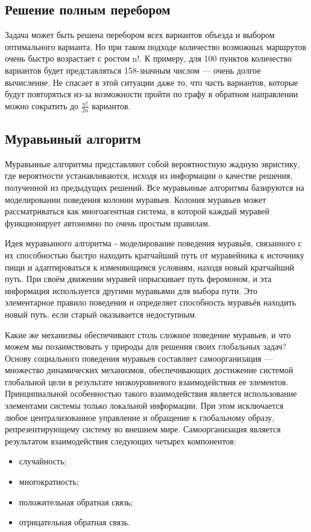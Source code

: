 \documentclass[a4paper, 12pt]{article}
\begin{document}
	\subsection{Решение полным перебором}
	\hspace*{5mm} Задача может быть решена перебором всех вариантов объезда и выбором оптимального варианта. Но при таком подходе количество возможных маршрутов очень быстро возрастает с ростом n!. К примеру, для 100 пунктов количество вариантов будет представляться 158-значным числом — очень долгое вычисление. Не спасает в этой ситуации даже то, что часть вариантов, которые будут повторяться из-за возможности пройти по графу в обратном направлении можно сократить до $\frac{n!}{2n}$ вариантов.
	\subsection{Муравьиный алгоритм}
	\hspace*{5mm} Муравьиные алгоритмы представляют собой вероятностную жадную эвристику, где вероятности устанавливаются, исходя из информации о качестве решения, полученной из предыдущих решений. Все муравьиные алгоритмы базируются на моделировании поведения колонии муравьев. Колония муравьев может рассматриваться как многоагентная система, в которой каждый муравей функционирует автономно по очень простым правилам.
	
	
	 \hspace*{5mm}Идея муравьиного алгоритма - моделирование поведения муравьёв, связанного с их способностью быстро находить кратчайший путь от муравейника к источнику пищи и адаптироваться к изменяющимся условиям, находя новый кратчайший путь. При своём движении муравей опрыскивает путь феромоном, и эта информация используется другими муравьями для выбора пути. Это элементарное правило поведения и определяет способность муравьёв находить новый путь, если старый оказывается недоступным.
	
	\hspace*{5mm}Какие же механизмы обеспечивают столь сложное поведение муравьев, и что можем мы позаимствовать у природы для решения своих глобальных задач? Основу социального поведения муравьев составляет самоорганизация — множество динамических механизмов, обеспечивающих достижение системой глобальной цели в результате низкоуровневого взаимодействия ее элементов. Принципиальной особенностью такого взаимодействия является использование элементами системы только локальной информации. При этом исключается любое централизованное управление и обращение к глобальному образу, репрезентирующему систему во внешнем мире. Самоорганизация является результатом взаимодействия следующих четырех компонентов:
	\begin{itemize}
		\item случайность;
		\item многократность;
		\item положительная обратная связь;
		\item отрицательная обратная связь.
	\end{itemize}
	
\end{document}
